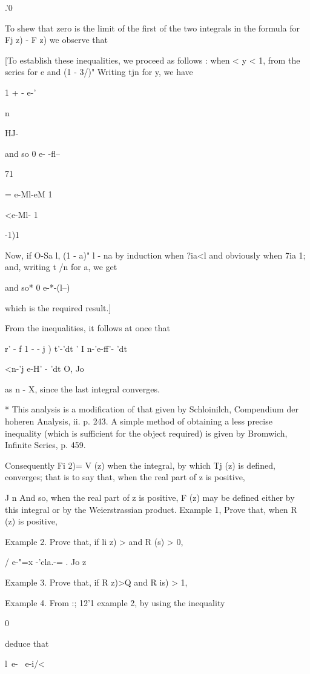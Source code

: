 .'0

To shew that zero is the limit of the first of the two integrals in
the formula for Fj z) - F z) we observe that

[To establish these inequalities, we proceed as follows : when < y <
1, from the series for e and (1 - 3/)" Writing tjn for y, we have

1 + - e-'

n

HJ-

and so 0 e- -fl--

71

= e-Ml-eM 1

<e-Ml- 1

-1)1

Now, if O-Sa l, (1 - a)" l - na by induction when ?ia<l and obviously
when 7ia 1; and, writing t /n for a, we get

and so* 0 e-*-(l--) %

which is the required result.]

From the inequalities, it follows at once that

r' - f 1 - - j ) t'-'dt ' I n-'e-ff'- 'dt

<n-'j e-H' - 'dt O, Jo

as n - X, since the last integral converges.

* This analysis is a modification of that given by Schloinilch,
Compendium der hoheren Analysis, ii. p. 243. A simple method of
obtaining a less precise inequality (which is sufficient for the
object required) is given by Bromwich, Infinite Series, p. 459.

%
%

Consequently Fi 2)= V (z) when the integral, by which Tj (z) is
defined, converges; that is to say that, when the real part of z is
positive,

J n And so, when the real part of z is positive, F (z) may be defined
either by this integral or by the Weierstrassian product. Example 1,
Prove that, when R (z) is positive,

Example 2. Prove that, if li z) > and R (s) > 0,

/ e-"=x -'cla.-= . Jo z

Example 3. Prove that, if R z)>Q and R is) > 1,

Example 4. From :; 12'1 example 2, by using the inequality

0%

deduce that

l\ e- \ e-i/<

